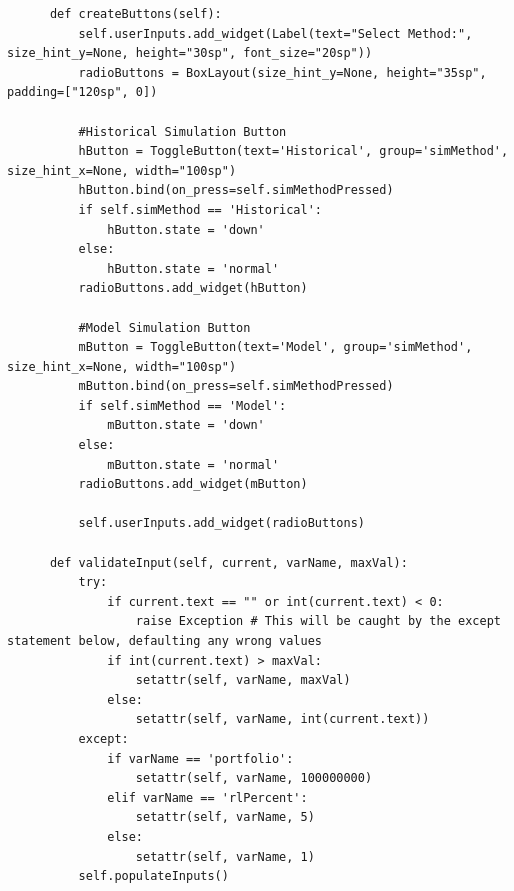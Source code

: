 \documentclass{article}
\begin{document}
\begin{verbatim}
      def createButtons(self):
          self.userInputs.add_widget(Label(text="Select Method:", size_hint_y=None, height="30sp", font_size="20sp"))
          radioButtons = BoxLayout(size_hint_y=None, height="35sp", padding=["120sp", 0])
          
          #Historical Simulation Button
          hButton = ToggleButton(text='Historical', group='simMethod', size_hint_x=None, width="100sp")
          hButton.bind(on_press=self.simMethodPressed)
          if self.simMethod == 'Historical':
              hButton.state = 'down'
          else:
              hButton.state = 'normal'
          radioButtons.add_widget(hButton)
          
          #Model Simulation Button
          mButton = ToggleButton(text='Model', group='simMethod', size_hint_x=None, width="100sp")
          mButton.bind(on_press=self.simMethodPressed)
          if self.simMethod == 'Model':
              mButton.state = 'down'
          else:
              mButton.state = 'normal'
          radioButtons.add_widget(mButton)

          self.userInputs.add_widget(radioButtons)
          
      def validateInput(self, current, varName, maxVal):
          try:
              if current.text == "" or int(current.text) < 0:
                  raise Exception # This will be caught by the except statement below, defaulting any wrong values
              if int(current.text) > maxVal:
                  setattr(self, varName, maxVal)
              else:            
                  setattr(self, varName, int(current.text))
          except:
              if varName == 'portfolio':
                  setattr(self, varName, 100000000)
              elif varName == 'rlPercent':
                  setattr(self, varName, 5)
              else:
                  setattr(self, varName, 1)
          self.populateInputs()


\end{verbatim}
\end{document}

